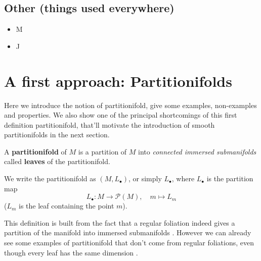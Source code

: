 	\subsection{Other (things used everywhere)}
        


		\begin{itemize}
			\item M
			\item J
		\end{itemize}


\section{A first approach: Partitionifolds}

	Here we introduce the notion of partitionifold, give some examples, non-examples and properties. We also show {\color{Red}one of the principal shortcomings} of this first definition partitionifold, that'll motivate the introduction of smooth partitionifolds in the next section.

	\begin{definition}
		A \textbf{partitionifold} of $M$ is a partition of $M$ into \emph{connected immersed submanifolds} called \textbf{leaves} of the partitionifold.

		We write the partitionifold as $(M, L_\bullet)$, or simply $L_\bullet$, where $L_\bullet$ is the partition map
		$$
			L_\bullet : M \to \mathcal{P}(M), \quad m \mapsto L_m
		$$
		($L_m$ is the leaf containing the point $m$).

	\end{definition}

	This definition is built from the fact that a regular foliation indeed gives a partition of the manifold into immersed submanifolds . However we can already see some examples of partitionifold that don't come from regular foliations, even though every leaf has the same dimension .

